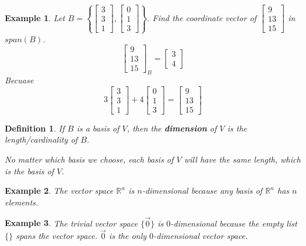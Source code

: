 \documentclass[11pt]{article}
\newtheorem{defn}{Definition}
\newtheorem{ex}{Example}
\begin{document}
\begin{ex}
  Let $B = \left\{ \begin{bmatrix} 3 \\ 3 \\ 1 \end{bmatrix}, \begin{bmatrix} 0 \\ 1 \\ 3 \end{bmatrix}\right\}$.
  Find the coordinate vector of $\begin{bmatrix} 9 \\ 13 \\ 15\end{bmatrix}$ in $span(B)$.
  \[\begin{bmatrix} 9 \\ 13 \\ 15 \end{bmatrix}_{B} = \begin{bmatrix} 3 \\ 4\end{bmatrix}\]
  Becuase
  \[3\begin{bmatrix} 3 \\ 3 \\ 1 \end{bmatrix} + 4 \begin{bmatrix} 0 \\ 1 \\ 3 \end{bmatrix} = \begin{bmatrix} 9 \\ 13 \\ 15 \end{bmatrix}\]
\end{ex}


\begin{defn}
  If $B$ is a basis of $V$, then the \textbf{dimension} of $V$ is the length/cardinality of $B$.

  No matter which basis we choose, each basis of $V$ will have the same length, which is the basis of $V$.
\end{defn}

\begin{ex}
  The vector space $\mathbb{R}^{n}$ is $n$-dimensional because any basis of $\mathbb{R}^{n}$ has $n$ elements.
\end{ex}

\begin{ex}
  The trivial vector space $\{\vec{0}\}$ is $0$-dimensional because the empty list $\{\}$ spans the vector space.
  ${\vec{0}}$ is the only $0$-dimensional vector space.
\end{ex}
\end{document}
